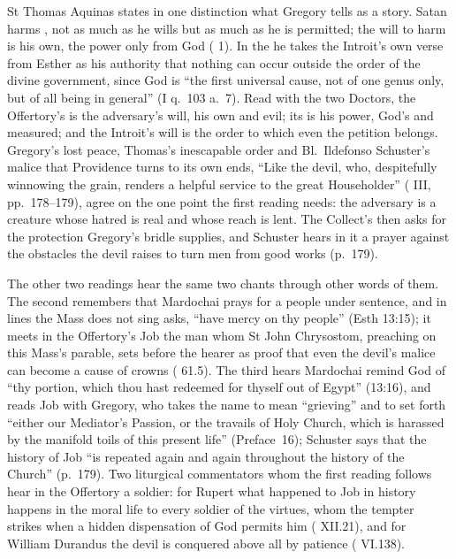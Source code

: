 St Thomas Aquinas states in one distinction what Gregory tells as a story.
Satan harms , not as much as he
wills but as much as he is permitted; the will to harm is his own, the power only
from God ( 1). In the  he takes the
Introit's own verse from Esther as his authority that nothing can occur outside
the order of the divine government, since God is ``the first universal cause,
not of one genus only, but of all being in general'' (I q.~103 a.~7). Read with
the two Doctors, the Offertory's  is the adversary's will, his own
and evil; its  is his power, God's and measured;
and the Introit's will is the order to which even the petition belongs.
Gregory's lost peace, Thomas's inescapable order and Bl.\ Ildefonso Schuster's
malice that Providence turns to its own ends, ``Like the devil, who, despitefully
winnowing the grain, renders a helpful service to the great Householder''
( III, pp.~178--179), agree on the one point the first
reading needs: the adversary is a creature whose hatred is real and whose reach
is lent. The Collect's  then asks for the protection
Gregory's bridle supplies, and Schuster hears in it a prayer against the
obstacles the devil raises to turn men from good works (p.~179).

The other two readings hear the same two chants through other words of them.
The second remembers that Mardochai prays for a people under sentence, and in
lines the Mass does not sing asks, ``have mercy on thy people'' (Esth 13:15); it
meets in the Offertory's Job the man whom St John Chrysostom, preaching on this
Mass's parable, sets before the hearer as proof that even the devil's malice can
become a cause of crowns ( 61.5). The third hears
Mardochai remind God of ``thy portion, which thou hast redeemed for thyself out
of Egypt'' (13:16), and reads Job with Gregory, who takes the name to mean
``grieving'' and to set forth ``either our Mediator's Passion, or the travails
of Holy Church, which is harassed by the manifold toils of this present life''
(Preface~16); Schuster says that the history of Job ``is repeated again and
again throughout the history of the Church'' (p.~179). Two liturgical
commentators whom the first reading follows hear in the Offertory a soldier: for Rupert what happened
to Job in history happens in the moral life to every soldier of the virtues,
whom the tempter strikes when a hidden dispensation of God permits him ( XII.21), and for William Durandus the devil is conquered above
all by patience ( VI.138).

